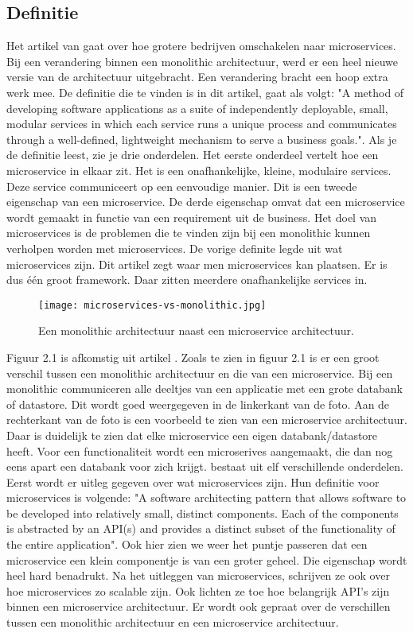 \subsection{Definitie}
Het artikel van \textcite{Mauersberger2017} gaat over hoe grotere bedrijven omschakelen naar microservices. Bij een verandering binnen een monolithic architectuur, werd er een heel nieuwe versie van de architectuur uitgebracht. Een verandering bracht een hoop extra werk mee. De definitie die te vinden is in dit artikel, gaat als volgt: "A method of developing software applications as a suite of independently deployable, small, modular services in which each service runs a unique process and communicates through a well-defined, lightweight mechanism to serve a business goals.". Als je de definitie leest, zie je drie onderdelen. Het eerste onderdeel vertelt hoe een microservice in elkaar zit. Het is een onafhankelijke, kleine, modulaire services. Deze service communiceert op een eenvoudige manier. Dit is een tweede eigenschap van een microservice. De derde eigenschap omvat dat een microservice wordt gemaakt in functie van een requirement uit de business. Het doel van microservices is de problemen die te vinden zijn bij een monolithic kunnen verholpen worden met microservices. De vorige definite legde uit wat microservices zijn. Dit artikel zegt waar men microservices kan plaatsen. Er is dus één groot framework. Daar zitten meerdere onafhankelijke services in.
\begin{figure}[h]
	\caption{Een monolithic architectuur naast een microservice architectuur.}
	\texttt{[image: microservices-vs-monolithic.jpg]}
	\centering
\end{figure}
Figuur 2.1 is afkomstig uit artikel \textcite{WattsShif2018}.
Zoals te zien in figuur 2.1 is er een groot verschil tussen een monolithic architectuur en die van een microservice. Bij een monolithic communiceren alle deeltjes van een applicatie met een grote databank of datastore. Dit wordt goed weergegeven in de linkerkant van de foto. Aan de rechterkant van de foto is een voorbeeld te zien van een microservice architectuur. Daar is duidelijk te zien dat elke microservice een eigen databank/datastore heeft. Voor een functionaliteit wordt een microserives aangemaakt, die dan nog eens apart een databank voor zich krijgt. 
\textcite{series2018} bestaat uit elf verschillende onderdelen. Eerst wordt er uitleg gegeven over wat microservices zijn. Hun definitie voor microservices is volgende: "A software architecting pattern that allows software to be developed into relatively small, distinct components. Each of the components is abstracted by an API(s) and provides a distinct subset of the functionality of the entire application". Ook hier zien we weer het puntje passeren dat een microservice een klein componentje is van een groter geheel. Die eigenschap wordt heel hard benadrukt. Na het uitleggen van microservices, schrijven ze ook over hoe microservices zo scalable zijn. Ook lichten ze toe hoe belangrijk API's zijn binnen een microservice architectuur. Er wordt ook gepraat over de verschillen tussen een monolithic architectuur en een microservice architectuur. 
